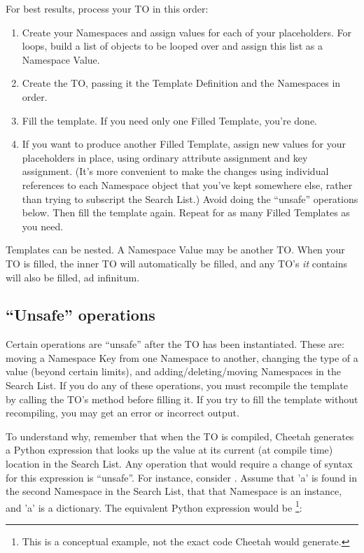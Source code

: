 For best results, process your TO in this order:

\begin{enumerate}

\item   Create your Namespaces and assign values for each of your placeholders.
     For  loops, build a list of objects to be looped over and
     assign this list as a Namespace Value.

\item   Create the TO, passing it the Template Definition and the Namespaces in
     order.

\item   Fill the template.  If you need only one Filled Template, you're done.

\item  If you want to produce another Filled Template, assign new values for
     your placeholders in place, using ordinary attribute assignment and key
     assignment.  (It's more convenient to make the changes using individual
     references to each Namespace object that you've kept somewhere else, 
     rather than trying to subscript the Search List.)  Avoid doing the
     ``unsafe'' operations below.  Then fill the template again.  Repeat for as
     many Filled Templates as you need.

\end{enumerate}

Templates can be nested.  A Namespace Value may be another TO.  When your TO
is filled, the inner TO will automatically be filled, and any TO's {\em it}
contains will also be filled, ad infinitum.


\subsection{``Unsafe'' operations}

Certain operations are ``unsafe'' after the TO has been instantiated.  These
are: moving a Namespace Key from one Namespace to another, changing the type of
a value (beyond certain limits), and adding/deleting/moving Namespaces in the
Search List. If you do any of these operations, you must recompile the template
by calling the TO's  method before filling it.  If you try
to fill the template without recompiling, you may get an error or incorrect
output.

To understand why, remember that when the TO is
compiled, Cheetah generates a Python expression that looks up the value at its
current (at compile time) location in the Search List.  Any operation that 
would require a change of syntax for this expression is ``unsafe''.  For
instance, consider .  Assume that 'a' is found in the second 
Namespace in the Search List, that that Namespace is an instance, and 'a' is
a dictionary.  The equivalent Python expression would be \footnote{This is a
conceptual example, not the exact code Cheetah would generate.}:

